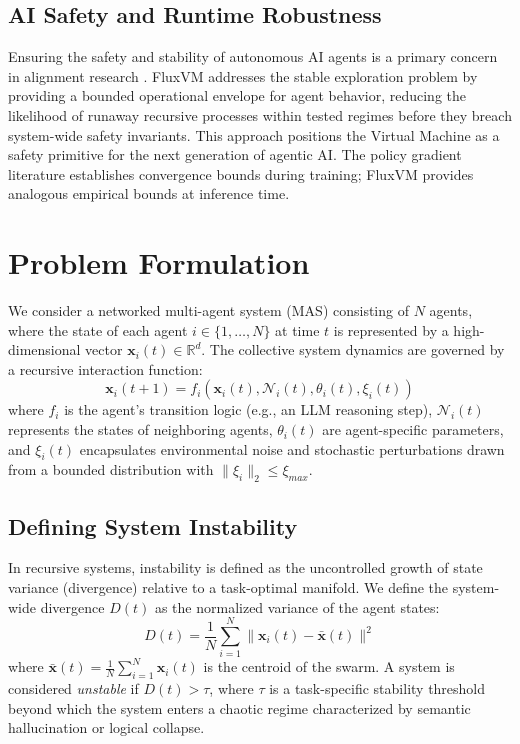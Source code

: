 \documentclass{article}
\begin{document}
\subsection{AI Safety and Runtime Robustness}
Ensuring the safety and stability of autonomous AI agents is a primary concern in alignment research \cite{amodei2016concrete, hendrycks2023overview}. FluxVM addresses the stable exploration problem by providing a bounded operational envelope for agent behavior, reducing the likelihood of runaway recursive processes within tested regimes before they breach system-wide safety invariants. This approach positions the Virtual Machine as a safety primitive for the next generation of agentic AI. The policy gradient literature \cite{schulman2017proximal, sutton2018reinforcement} establishes convergence bounds during training; FluxVM provides analogous empirical bounds at inference time.

\newpage

\section{Problem Formulation}
\label{sec:problem_formulation}

We consider a networked multi-agent system (MAS) consisting of $N$ agents, where the state of each agent $i \in \{1, \dots, N\}$ at time $t$ is represented by a high-dimensional vector $\mathbf{x}_i(t) \in \mathbb{R}^d$. The collective system dynamics are governed by a recursive interaction function:
\begin{equation}
    \mathbf{x}_i(t+1) = f_i\left(\mathbf{x}_i(t), \mathcal{N}_i(t), \theta_i(t), \xi_i(t)\right)
\end{equation}
where $f_i$ is the agent's transition logic (e.g., an LLM reasoning step), $\mathcal{N}_i(t)$ represents the states of neighboring agents, $\theta_i(t)$ are agent-specific parameters, and $\xi_i(t)$ encapsulates environmental noise and stochastic perturbations drawn from a bounded distribution with $\|\xi_i\|_2 \leq \xi_{max}$.

\subsection{Defining System Instability}
In recursive systems, instability is defined as the uncontrolled growth of state variance (divergence) relative to a task-optimal manifold. We define the system-wide divergence $D(t)$ as the normalized variance of the agent states:
\begin{equation}
    D(t) = \frac{1}{N} \sum_{i=1}^N \|\mathbf{x}_i(t) - \bar{\mathbf{x}}(t)\|^2
\end{equation}
where $\bar{\mathbf{x}}(t) = \frac{1}{N}\sum_{i=1}^N \mathbf{x}_i(t)$ is the centroid of the swarm. A system is considered \textit{unstable} if $D(t) > \tau$, where $\tau$ is a task-specific stability threshold beyond which the system enters a chaotic regime characterized by semantic hallucination or logical collapse.
\end{document}
